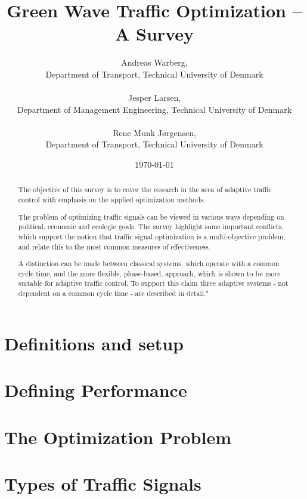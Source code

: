\documentclass [a4paper, 10pt]{article}
\title{Green Wave Traffic Optimization -- A Survey}
\author{Andreas Warberg,\\ Department of Transport, Technical University of Denmark\\ ~ \\ 
Jesper Larsen,\\ Department of Management Engineering, Technical University of Denmark\\ ~ \\ Rene Munk J{\o}rgensen,\\ Department of Transport, Technical University of Denmark}
\date{\today}
\begin{document}
\setlength{\parindent}{4mm}

\maketitle

\begin{abstract}
The objective of this survey is to cover the research in the area of
adaptive traffic control with emphasis on the applied optimization
methods.

The problem of optimizing traffic signals can be viewed in various
ways depending on political, economic and ecologic goals. The survey
highlight some important conflicts, which support the notion that
traffic signal optimization is a multi-objective problem, and relate
this to the most common measures of effectiveness.

A distinction can be made between classical systems, which operate
with a common cycle time, and the more flexible, phase-based,
approach, which is shown to be more suitable for adaptive traffic
control. To support this claim three adaptive systems - not dependent
on a common cycle time - are described in detail."
\end{abstract}



\section{Definitions and setup}


%

\section{Defining Performance}


\section{The Optimization Problem}


\section{Types of Traffic Signals}

\end{document}
